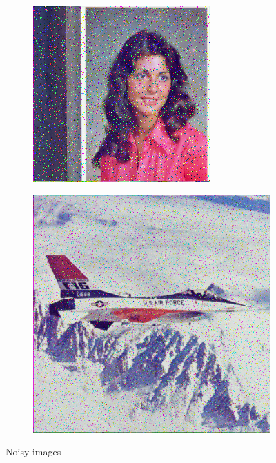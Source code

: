 \begin{subfigure}{0.9\textwidth}
\begin{subfigure}[t]{0.15\textwidth}
    \centering
  \end{subfigure}
\begin{subfigure}[t]{0.15\textwidth}
    \includegraphics[width=0.9\linewidth]{../images/outputs/denoise/before/before4.png}
    
    \centering
  \end{subfigure}
\begin{subfigure}[t]{0.15\textwidth}
    \includegraphics[width=0.9\linewidth]{../images/outputs/denoise/before/before5.png}
    
    \centering
  \end{subfigure}
 \caption{Noisy images}
 \end{subfigure}

